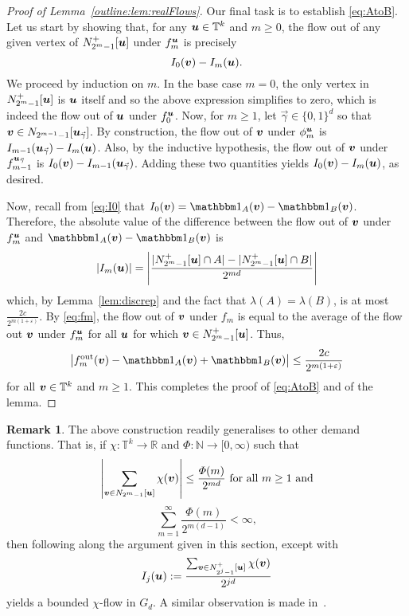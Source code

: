 \documentclass[12pt,a4paper]{amsart}
\numberwithin{equation}{section}
\theoremstyle{definition}
\newtheorem{remark}[equation]{Remark}
\begin{document}
\begin{proof}[Proof of Lemma~\ref{outline:lem:realFlows}]
Our final task is to establish \eqref{eq:AtoB}. Let us start by showing that, for any $\boldsymbol{u}\in \mathbb{T}^k$ and $m\geq0$, the flow out of any given vertex of $N_{2^{m}-1}^+[\boldsymbol{u}]$ under $f_m^{\boldsymbol{u}}$ is precisely
\[I_0(\boldsymbol{v})-I_m(\boldsymbol{u}).\]
We proceed by induction on $m$. In the base case $m=0$, the only vertex in $N_{2^{m}-1}^+[\boldsymbol{u}]$ is $\boldsymbol{u}$ itself and so the above expression simplifies to zero, which is indeed the flow out of $\boldsymbol{u}$ under $f_0^{\boldsymbol{u}}$. Now, for $m\geq1$, let $\vec{\gamma}\in\{0,1\}^d$ so that $\boldsymbol{v}\in N_{2^{m-1}-1}[\boldsymbol{u}_{\vec{\gamma}}]$. By construction, the flow out of $\boldsymbol{v}$ under $\phi_{m}^{\boldsymbol{u}}$ is $I_{m-1}(\boldsymbol{u}_{\vec{\gamma}})-I_m(\boldsymbol{u})$. Also, by the inductive hypothesis, the flow out of $\boldsymbol{v}$ under $f_{m-1}^{\boldsymbol{u}_{\vec{\gamma}}}$ is $I_0(\boldsymbol{v}) - I_{m-1}(\boldsymbol{u}_{\vec{\gamma}})$. Adding these two quantities yields $I_0(\boldsymbol{v})-I_m(\boldsymbol{u})$, as desired. 

Now, recall from \eqref{eq:I0} that $I_0(\vvec{v})=\ind_A(\vvec{v})-\ind_B(\vvec{v})$. Therefore, the absolute value of the difference between the flow out of $\boldsymbol{v}$ under $f_m^{\boldsymbol{u}}$ and $\ind_A(\vvec{v})-\ind_B(\vvec{v})$ is 
\[|I_m(\boldsymbol{u})| = \left|\frac{|N_{2^m-1}^+[\boldsymbol{u}]\cap A|-|N_{2^m-1}^+[\boldsymbol{u}]\cap B|}{2^{md}}\right|\]
which, by Lemma~\ref{lem:discrep} and the fact that $\lambda(A)=\lambda(B)$, is at most $\frac{2c}{2^{m(1+\varepsilon)}}$. By \eqref{eq:fm}, the flow out of $\boldsymbol{v}$ under $f_m$ is equal to the average of the flow out $\boldsymbol{v}$ under $f_m^{\boldsymbol{u}}$ for all $\boldsymbol{u}$ for which $\boldsymbol{v}\in N_{2^{m}-1}^+[\boldsymbol{u}]$. Thus, 
\[\left|\fout{f_m}(\vvec{v})-\ind_A(\vvec{v})+\ind_B(\vvec{v})\right|\leq \frac{2c}{2^{m(1+\varepsilon)}}\]
for all $\boldsymbol{v}\in \mathbb{T}^k$ and $m\geq1$. This completes the proof of \eqref{eq:AtoB} and of the lemma. 
\end{proof}

\begin{remark}
The above construction readily generalises to other demand functions. That is, if $\chi:\mathbb{T}^k\to\mathbb{R}$ and $\Phi:\mathbb{N}\to[0,\infty)$ such that
\[\left|\sum_{\boldsymbol{v}\in N_{2^{m}-1}[\boldsymbol{u}]}\chi(\boldsymbol{v})\right|\leq \frac{\Phi(m)}{2^{md}}\text{ for all }m\geq1\text{ and}\]
\[\sum_{m=1}^\infty\frac{\Phi(m)}{2^{m(d-1)}}<\infty,\]
then following along the argument given in this section, except with 
\[I_j(\boldsymbol{u}) := \frac{\sum_{\boldsymbol{v}\in N_{2^j-1}^+[\boldsymbol{u}]}\chi(\boldsymbol{v})}{2^{jd}}\]
yields a bounded $\chi$-flow in $G_d$. A similar observation is made in~\cite[Lemma~4.2]{MarksUnger17}.
\end{remark}
\end{document}
